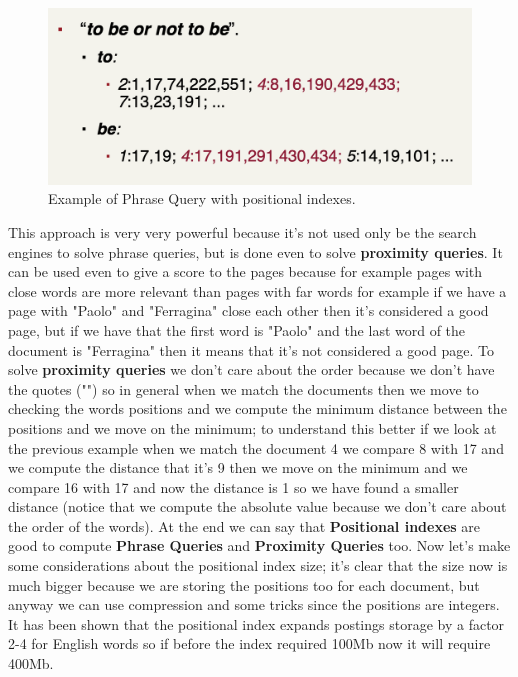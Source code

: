 \begin{figure}
    \centering
    \includegraphics[width=0.75\linewidth]{images/phrasequery.png}
    \caption{Example of Phrase Query with positional indexes.}
    \label{fig:phrasequerypositionalindexes}
\end{figure}
This approach is very very powerful because it's not used only be the search engines to solve phrase queries, but is done even to solve \textbf{proximity queries}. It can be used even to give a score to the pages because for example pages with close words are more relevant than pages with far words for example if we have a page with "Paolo" and "Ferragina" close each other then it's considered a good page, but if we have that the first word is "Paolo" and the last word of the document is "Ferragina" then it means that it's not considered a good page.\newline
To solve \textbf{proximity queries} we don't care about the order because we don't have the quotes ("") so in general when we match the documents then we move to checking the words positions and we compute the minimum distance between the positions and we move on the minimum; to understand this better if we look at the previous example when we match the document 4 we compare 8 with 17 and we compute the distance that it's 9 then we move on the minimum and we compare 16 with 17 and now the distance is 1 so we have found a smaller distance (notice that we compute the absolute value because we don't care about the order of the words).\newline
At the end we can say that \textbf{Positional indexes} are good to compute \textbf{Phrase Queries} and \textbf{Proximity Queries} too.\newline
Now let's make some considerations about the positional index size; it's clear that the size now is much bigger because we are storing the positions too for each document, but anyway we can use compression and some tricks since the positions are integers. It has been shown that the positional index expands postings storage by a factor 2-4 for English words so if before the index required 100Mb now it will require 400Mb.\newline
